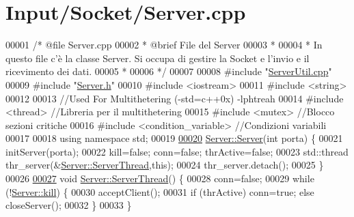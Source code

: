 \hypertarget{Server_8cpp_source}{\section{\-Input/\-Socket/\-Server.cpp}
}

\begin{DoxyCode}
00001 \textcolor{comment}{/* @file Server.cpp}
00002 \textcolor{comment}{ * @brief File del Server}
00003 \textcolor{comment}{ *}
00004 \textcolor{comment}{ * In questo file c'è la classe Server. Si occupa di gestire la Socket e
       l'invio e il ricevimento dei dati.}
00005 \textcolor{comment}{ *}
00006 \textcolor{comment}{ */}
00007 
00008 \textcolor{preprocessor}{#include "\hyperlink{ServerUtil_8cpp}{ServerUtil.cpp}"}
00009 \textcolor{preprocessor}{#include "\hyperlink{Server_8h}{Server.h}"}
00010 \textcolor{preprocessor}{#include <iostream>}
00011 \textcolor{preprocessor}{#include <string>}
00012 
00013 \textcolor{comment}{//Used For Multithetering (-std=c++0x) -lphtreah}
00014 \textcolor{preprocessor}{#include <thread>}                                   \textcolor{comment}{//Libreria per il
       multithetering}
00015 \textcolor{preprocessor}{#include <mutex>}                                    \textcolor{comment}{//Blocco sezioni critiche}
00016 \textcolor{preprocessor}{#include <condition\_variable>}                       \textcolor{comment}{//Condizioni variabili}
00017 
00018 \textcolor{keyword}{using namespace }std;
00019 
\hypertarget{Server_8cpp_source_l00020}{}\hyperlink{classServer_af11aa19a47fed238c575c432bd7f1ce9}{00020} \hyperlink{classServer_af11aa19a47fed238c575c432bd7f1ce9}{Server::Server}(\textcolor{keywordtype}{int} porta) \{
00021     initServer(porta);
00022     kill=\textcolor{keyword}{false}; conn=\textcolor{keyword}{false}; thrActive=\textcolor{keyword}{false};
00023     std::thread thr\_server(&\hyperlink{classServer_a4b2f368d2da82dcdfa1523e27840cd3e}{Server::ServerThread},\textcolor{keyword}{this});
00024     thr\_server.detach();
00025 \}
00026 
\hypertarget{Server_8cpp_source_l00027}{}\hyperlink{classServer_a4b2f368d2da82dcdfa1523e27840cd3e}{00027} \textcolor{keywordtype}{void} \hyperlink{classServer_a4b2f368d2da82dcdfa1523e27840cd3e}{Server::ServerThread}() \{
00028     conn=\textcolor{keyword}{false};
00029     \textcolor{keywordflow}{while} (!\hyperlink{classServer_a693131a2a6c6a5df3461fbdefa73b0b2}{Server::kill}) \{
00030         acceptClient();
00031         \textcolor{keywordflow}{if} (thrActive) conn=\textcolor{keyword}{true}; \textcolor{keywordflow}{else} closeServer();
00032     \}
00033 \}

\end{DoxyCode}
